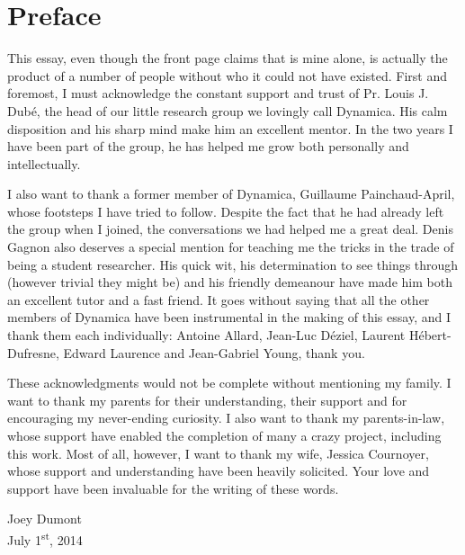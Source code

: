 \chapter*{Preface}
This essay, even though the front page claims that is mine alone, 
is actually the product of a number of people without who it
could not have existed. First and foremost, I must acknowledge
the constant support and trust of Pr. Louis J. Dubé, the head
of our little research group we lovingly call Dynamica. His calm
disposition and his sharp mind make him an excellent mentor. 
In the two years I have been part of the group, he has helped
me grow both personally and intellectually. 

I also want to thank a former member of Dynamica, 
Guillaume Painchaud-April, whose footsteps I have
tried to follow. Despite the fact that he had already left
the group when I joined, the conversations we had helped me
a great deal. Denis Gagnon also deserves a special mention
for teaching me the tricks in the trade of being a student
researcher. His quick wit, his determination to see things through
(however trivial they might be) 
and  his friendly demeanour have made him both an excellent tutor 
and a fast friend. It goes without saying that all the other
members of Dynamica have been instrumental in the making 
of this essay, and I thank them each individually: Antoine 
Allard, Jean-Luc Déziel, Laurent Hébert-Dufresne, Edward
Laurence and Jean-Gabriel Young, thank you. 

These acknowledgments would not be complete without
mentioning my family. I want to thank my parents 
for their understanding, their support and for 
encouraging my never-ending curiosity. I also 
want to thank my parents-in-law, whose support 
have enabled the completion of many a crazy project, 
including this work. Most of all, however, I want to 
thank my wife, Jessica Cournoyer, whose support and 
understanding have been heavily solicited. Your love and support
have been invaluable for the writing of these words. 

\begin{flushright}
Joey Dumont\\
July 1\textsuperscript{st}, 2014
\end{flushright}